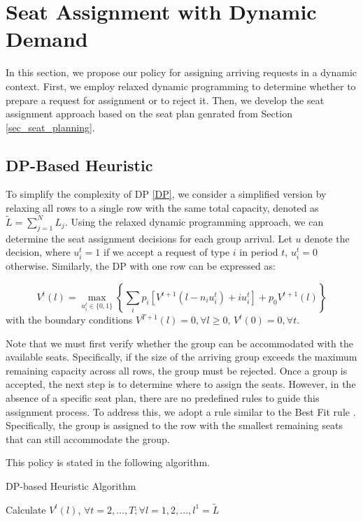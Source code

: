\section{Seat Assignment with Dynamic Demand}\label{sec_dynamic}
In this section, we propose our policy for assigning arriving requests in a dynamic context. First, we employ relaxed dynamic programming to determine whether to prepare a request for assignment or to reject it. Then, we develop the seat assignment approach based on the seat plan genrated from Section \ref{sec_seat_planning}.


\subsection{DP-Based Heuristic}
To simplify the complexity of DP \eqref{DP}, we consider a simplified version by relaxing all rows to a single row with the same total capacity, denoted as $\tilde{L} = \sum_{j=1}^{N} L_j$.  Using the relaxed dynamic programming approach, we can determine the seat assignment decisions for each group arrival. Let $u$ denote the decision, where $u_{i}^{t} = 1$ if we accept a request of type $i$ in period $t$, $u_{i}^{t} =0$ otherwise. Similarly, the DP with one row can be expressed as:

$$V^{t}(l) =  \max_{u_{i}^{t} \in \{0,1\}} \left\{ \sum_{i} p_i [V^{t+1}(l-n_i u_{i}^{t})+ i u_{i}^{t}] + p_0 V^{t+1}(l)\right\} $$
with the boundary conditions $V^{T+1}(l) =0, \forall l \geq 0$, $V^{t}(0) =0, \forall t$.


Note that we must first verify whether the group can be accommodated with the available seats. Specifically, if the size of the arriving group exceeds the maximum remaining capacity across all rows, the group must be rejected. Once a group is accepted, the next step is to determine where to assign the seats. However, in the absence of a specific seat plan, there are no predefined rules to guide this assignment process. To address this, we adopt a rule similar to the Best Fit rule \cite{johnson1974fast}. Specifically, the group is assigned to the row with the smallest remaining seats that can still accommodate the group.

This policy is stated in the following algorithm.

\begin{algorithm}[H]
  \caption{DP-based Heuristic Algorithm}\label{algo_dp_heuris}
  Calculate $V^{t}(l)$, $\forall t =2, \ldots, T; \forall l = 1, 2, \ldots, l^{1}=\tilde{L}$\;
\end{algorithm}

